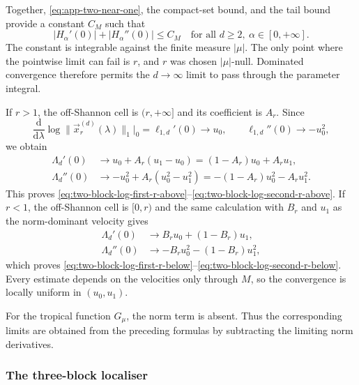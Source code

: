 \documentclass[aps,pra,11pt,onecolumn,nofootinbib,tightenlines]{revtex4-2}
\theoremstyle{definition}
\begin{document}
Together, \eqref{eq:app-two-near-one}, the compact-set bound, and the tail bound provide a constant $C_M$ such that
\begin{equation}
 |H_\alpha'(0)|+|H_\alpha''(0)|\leq C_M
 \quad\text{for all }d\geq2,\ \alpha\in[0,+\infty].
 \label{eq:app-two-global-dominator}
\end{equation}
The constant is integrable against the finite measure $|\mu|$.  The only point where the pointwise limit can fail is $r$, and $r$ was chosen $|\mu|$-null.  Dominated convergence therefore permits the $d\to\infty$ limit to pass through the parameter integral.

If $r>1$, the off-Shannon cell is $(r,+\infty]$ and its coefficient is $A_r$.  Since
\begin{equation}
 \frac{\mathrm d}{\mathrm d\lambda}\log\|\vec x_r^{(d)}(\lambda)\|_1\bigg|_{0}
 =\ell_{1,d}'(0)\longrightarrow u_0,
 \qquad
 \ell_{1,d}''(0)\longrightarrow-u_0^2,
 \label{eq:app-two-norm-r-above}
\end{equation}
we obtain
\begin{align}
 \Lambda_d'(0)
 &\longrightarrow u_0+A_r(u_1-u_0)
 =(1-A_r)u_0+A_ru_1,
 \label{eq:app-two-final-first-above}\\
 \Lambda_d''(0)
 &\longrightarrow-u_0^2+A_r(u_0^2-u_1^2)
 =-(1-A_r)u_0^2-A_ru_1^2.
 \label{eq:app-two-final-second-above}
\end{align}
This proves \eqref{eq:two-block-log-first-r-above}--\eqref{eq:two-block-log-second-r-above}.  If $r<1$, the off-Shannon cell is $[0,r)$ and the same calculation with $B_r$ and $u_1$ as the norm-dominant velocity gives
\begin{align}
 \Lambda_d'(0)&\longrightarrow B_ru_0+(1-B_r)u_1,
 \label{eq:app-two-final-first-below}\\
 \Lambda_d''(0)&\longrightarrow-B_ru_0^2-(1-B_r)u_1^2,
 \label{eq:app-two-final-second-below}
\end{align}
which proves \eqref{eq:two-block-log-first-r-below}--\eqref{eq:two-block-log-second-r-below}.  Every estimate depends on the velocities only through $M$, so the convergence is locally uniform in $(u_0,u_1)$.

For the tropical function $G_\mu$, the norm term is absent.  Thus the corresponding limits are obtained from the preceding formulas by subtracting the limiting norm derivatives.

\subsubsection{The three-block localiser}
\end{document}
